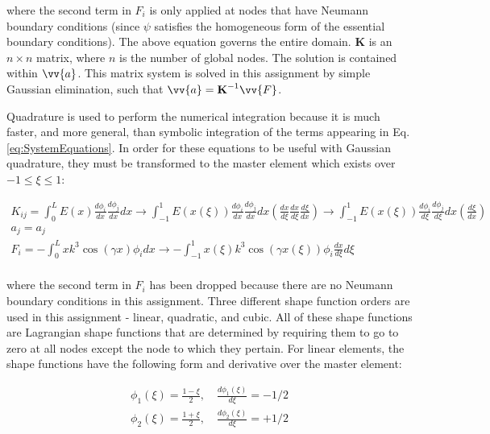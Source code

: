 \documentclass[10pt]{article}
\begin{document}
where the second term in \(F_i\) is only applied at nodes that have Neumann boundary conditions (since \(\psi\) satisfies the homogeneous form of the essential boundary conditions). The above equation governs the entire domain. \(\textbf{K}\) is an \(n \times n\) matrix, where \(n\) is the number of global nodes. The solution is contained within \(\vv{a}\). This matrix system is solved in this assignment by simple Gaussian elimination, such that \(\vv{a}=\textbf{K}^{-1}\vv{F}\).

Quadrature is used to perform the numerical integration because it is much faster, and more general, than symbolic integration of the terms appearing in Eq. \eqref{eq:SystemEquations}. In order for these equations to be useful with Gaussian quadrature, they must be transformed to the master element which exists over \(-1\leq\xi\leq1\):

\begin{equation}
\label{eq:GoverningEqnsIsoparametric}
\begin{aligned}
K_{ij}=\int_{0}^{L}E(x)\frac{d\phi_i}{dx}\frac{d\phi_j}{dx}dx\rightarrow\int_{-1}^{1}E(x(\xi))\frac{d\phi_i}{dx}\frac{d\phi_j}{dx}dx\left(\frac{dx}{d\xi}\frac{dx}{d\xi}\frac{d\xi}{dx}\right)\rightarrow\int_{-1}^{1}E(x(\xi))\frac{d\phi_i}{d\xi}\frac{d\phi_j}{d\xi}dx\left(\frac{d\xi}{dx}\right)\\
a_j=a_j\\
F_i=-\int_{0}^{L}xk^3\cos{(\gamma x)}\phi_idx\rightarrow-\int_{-1}^{1}x(\xi)k^3\cos{(\gamma x(\xi))}\phi_i\frac{dx}{d\xi}d\xi\\
\end{aligned}
\end{equation} 

where the second term in \(F_i\) has been dropped because there are no Neumann boundary conditions in this assignment. Three different shape function orders are used in this assignment - linear, quadratic, and cubic. All of these shape functions are Lagrangian shape functions that are determined by requiring them to go to zero at all nodes except the node to which they pertain. For linear elements, the shape functions have the following form and derivative over the master element:

\begin{equation}
\begin{aligned}
\phi_1(\xi)=\frac{1-\xi}{2},\quad\frac{d\phi_1(\xi)}{d\xi}=-1/2\\
\phi_2(\xi)=\frac{1+\xi}{2}, \quad\frac{d\phi_2(\xi)}{d\xi}=+1/2\\
\end{aligned}
\end{equation}
\end{document}
